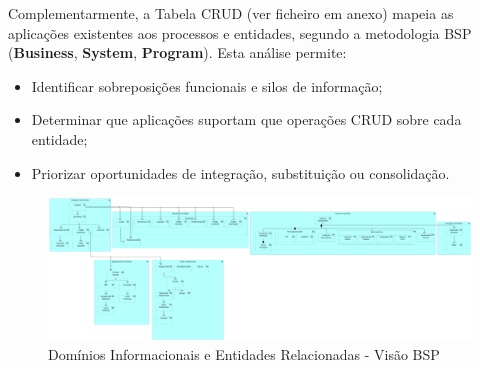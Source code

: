 \documentclass[12pt,a4paper,final]{article}
\begin{document}
    Complementarmente, a Tabela CRUD (ver ficheiro em anexo) mapeia as aplicações existentes aos processos e entidades, segundo a metodologia BSP (\textbf{Business}, \textbf{System}, \textbf{Program}). Esta análise permite:
    \begin{itemize}
        \item Identificar sobreposições funcionais e silos de informação;
        \item Determinar que aplicações suportam que operações CRUD sobre cada entidade;
        \item Priorizar oportunidades de integração, substituição ou consolidação.
    \end{itemize}

    \vspace{0.5cm}
    \begin{figure}[H]
        \centering
        \includegraphics[width=\textwidth]{Q13}
        \caption{Domínios Informacionais e Entidades Relacionadas - Visão BSP}
        \label{fig:q14-domains}
    \end{figure}


    \newpage
    \nocite{*}
    \printbibliography
\end{document}
